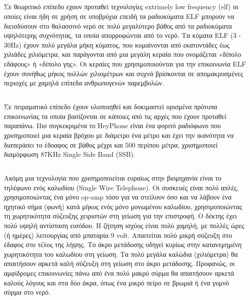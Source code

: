 \documentclass[12pt]{article}
\begin{document}
\begin{multicols}{2}
    \subsection{} Σε θεωριτικό επίπεδο εχουν προταθεί
    τεχνολογίες extrimely low frequency (elf) οι οποίες
    είναι ήδη σε χρήση σε υποβρύχια επειδή τα ραδιοκύματα
    ELF μπορούν να διεισδύσουν στο θαλασσινό νερό σε πολύ
    μεγαλύτερο βάθος από τα ραδιοκύματα υψηλότερης
    συχνότητας, τα οποία απορροφώνται από το νερό. Τα κύματα
    ELF (3 - 30Hz) έχουν πολύ μεγάλα μήκη κύματος, που
    κυμαίνονται από εκατοντάδες έως χιλιάδες χιλιόμετρα, και
    παράγονται από μια μεγάλη κεραία που ονομάζεται «δίπολο
    εδάφους» ή «δίπολο γης». Οι κεραίες που χρησιμοποιούνται
    για την επικοινωνία ELF έχουν συνήθως μήκος πολλών
    χιλιομέτρων και συχνά βρίσκονται σε απομακρυσμένες
    περιοχές με χαμηλά επίπεδα ανθρωπογενών παρεμβολών.

    \subsection{}
    Σε πειραματικό επίπεδο έχουν υλοποιηθεί και δοκιμαστεί
    ορισμένα πρότυπα επικοινωνίας τα οποία βασίζονται σε
    κάποιες από τις αρχές που έχουν προταθεί παραπάνω. Πιο
    συγκεκριμένα το HeyPhone είναι ένα φοριτό ραδιόφωνο που
    χρισημοποιεί μια κεραία βρόχου με διάμετρο ένα μέτρο και
    έχει την ικανότητα να διαπεράσει το έδοαφος σε βάθος
    μέχρι και 500 περίπου μέτρα, χρισημοποιεί διαμόρφωση
    87KHz Single Side Band (SSB).
    \subsection{}
    Ακόμη μια τεχνολογία που χρισημοποιείται ευραίως στην
    βιομηχανία είναι το τηλέφωνο ενός καλωδίου (Single Wire
    Telephone). Οι συσκευές είναι πολύ απλές,
    χρησιμοποιώντας ένα μόνο op-amp τόσο για να στείλουν όσο
    και να λάβουν ένα ηχητικό σήμα (φωνή) κατά μήκος ενός
    μόνο μονωμένου καλωδίου, χρησιμοποιώντας τη χωρητικότητα
    σύζευξης χειριστών στη γείωση για την επιστροφή. Ο
    δέκτης έχει πολύ υψηλή αντίσταση εισόδου. Η ζήτηση
    ισχύος είναι πολύ χαμηλή, με πολλές ώρες (ή ημέρες)
    λειτουργίας από μπαταρία 9 volt. Απαιτείται πολύ μικρή
    σύζευξη στο έδαφος στο τέλος της λήψης. Το άκρο
    μετάδοσης οδηγεί κυρίως στην κατανεμημένη χωρητικότητα
    του καλωδίου στη γείωση. Τα πολύ μεγάλα καλώδια
    (χιλιόμετρα) θα απαιτήσουν αρκετά καλή σύζευξη στη
    γείωση στο άκρο μετάδοσης. Προφανώς, οι αμφίδρομες
    επικοινωνίες πάνω από ένα πολύ μακρύ σύρμα θα απαιτήσουν
    αρκετά καλούς λόγους και στα δύο άκρα, όπως ένα μικρό
    πείρο σε βρωμιά ή ένα γυμνό σύρμα στο νερό.


\end{multicols}
\end{document}
